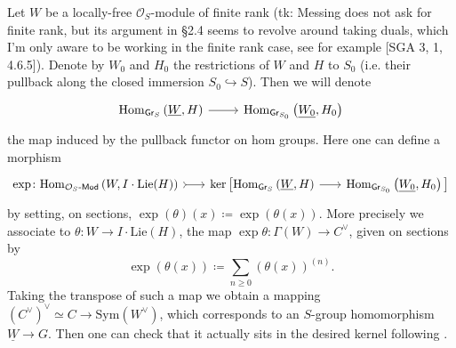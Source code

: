 \documentclass[../Main]{subfiles}
\begin{document}
\begin{defn}
	Let $W$ be a locally-free $\mathcal{O}_{ S }$-module of finite rank
	(tk: Messing does not ask for finite rank, but its argument in \S2.4
	seems to revolve around taking duals, which I'm only aware to be working
	in the finite rank case, see for example [SGA 3, 1, 4.6.5]).
	Denote by $W_0$ and $H_0$ the restrictions of $W$ and $H$ to 
	$S_0$ (i.e. their pullback along
	the closed immersion $S_0 \hookrightarrow S$).
	Then we will denote
	\begin{equation*}
	\begin{tikzcd}[row sep = 0ex
		,/tikz/column 1/.append style={anchor=base east}
		,/tikz/column 2/.append style={anchor=base west}]
		\mathrm{Hom}_{ \mathsf{Gr}_S } 
		\left( \underline{W}, H \right)
		\arrow[r, "", rightarrow] &
		\mathrm{Hom}_{ \mathsf{Gr}_{S_0} }
		\left( \underline{W_0}, H_0 \right)
	\end{tikzcd}
	\end{equation*} 
	the map induced by the pullback functor on hom groups.
	Here one can define a morphism
	\begin{equation*}
	\begin{tikzcd}[row sep = 0ex, column sep = 1.8em
		,/tikz/column 1/.append style={anchor=base east}
		,/tikz/column 2/.append style={anchor=base west}]
		\exp\colon
		\mathrm{Hom}_{ \mathcal{O}_{ S }\text{-}\mathsf{Mod} }
		\left( W, I \cdot \mathrm{Lie}(H) \right)
		\arrow[r, "", rightarrowtail] &
		\ker \big[ 
		\mathrm{Hom}_{ \mathsf{Gr}_S } 
		\left( \underline{W}, H \right)
		\arrow[r, "", rightarrow] &
		\mathrm{Hom}_{ \mathsf{Gr}_{S_0} }
		\left( \underline{W_0}, H_0 \right)
		\big]
	\end{tikzcd}
	\end{equation*} 
	by setting, on sections,
	$\exp (\theta) (x) \coloneqq \exp \left( \theta(x) \right)$.
	More precisely we associate to $\theta\colon W \to I \cdot \mathrm{Lie}(H)$,
	the map $\exp \theta\colon \Gamma(W) \to C^\vee$, given on sections by
	\begin{equation*}
	\exp \left( \theta(x) \right) \coloneqq
	\sum_{n\geq 0 } (\theta(x))^{(n)}
	.\end{equation*}
	Taking the transpose of such a map we obtain a mapping 
	$(C^\vee)^\vee \simeq C \to \mathrm{Sym}(W^\vee)$, which corresponds
	to an $S$-group homomorphism $\underline{W} \to G$.
	Then one can check that it actually sits in the desired kernel
	following \cite[Chapter III, \S2.4, 2.6]{Messing}.
\end{defn}
\end{document}
